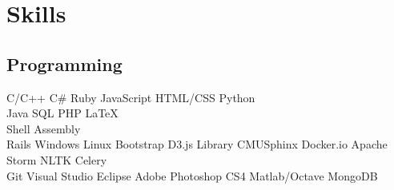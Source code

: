 \documentclass[]{deedy-resume-openfont}
\begin{document}
\begin{minipage}[t]{0.33\textwidth}
%
%
%

\section{Skills}
\subsection{Programming}
C/C++ \textbullet{}   C\# \textbullet{} Ruby \textbullet{} JavaScript \textbullet{} HTML/CSS \textbullet{} Python\\ 
Java \textbullet{} SQL \textbullet{} PHP \textbullet{} \LaTeX\ \\
Shell \textbullet{} Assembly \\
Rails \textbullet{} Windows \textbullet{} Linux \textbullet{} Bootstrap \textbullet{} D3.js Library \textbullet{} CMUSphinx \textbullet{} Docker.io \textbullet{} Apache Storm \textbullet{} NLTK \textbullet{} Celery \\
Git \textbullet{} Visual Studio \textbullet{} Eclipse \textbullet{} Adobe Photoshop CS4 \textbullet{} Matlab/Octave \textbullet{} MongoDB
\sectionsep



\end{minipage}
\end{document}

